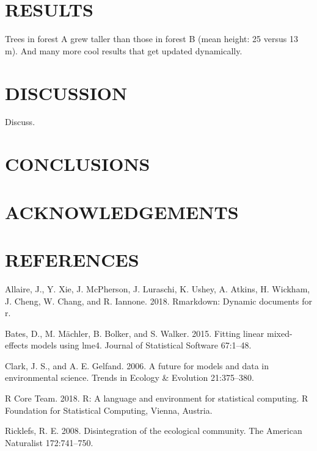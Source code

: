 \documentclass[11pt,a4paper]{article}
\begin{document}
\hypertarget{results}{%
\section{RESULTS}\label{results}}

Trees in forest A grew taller than those in forest B (mean height: 25
versus 13 m). And many more cool results that get updated dynamically.

\hypertarget{discussion}{%
\section{DISCUSSION}\label{discussion}}

Discuss.

\hypertarget{conclusions}{%
\section{CONCLUSIONS}\label{conclusions}}

\hypertarget{acknowledgements}{%
\section{ACKNOWLEDGEMENTS}\label{acknowledgements}}

\hypertarget{references}{%
\section{REFERENCES}\label{references}}

\hypertarget{refs}{}
\leavevmode\hypertarget{ref-Allaire_2018}{}%
Allaire, J., Y. Xie, J. McPherson, J. Luraschi, K. Ushey, A. Atkins, H.
Wickham, J. Cheng, W. Chang, and R. Iannone. 2018. Rmarkdown: Dynamic
documents for r.

\leavevmode\hypertarget{ref-Bates_2015}{}%
Bates, D., M. Mächler, B. Bolker, and S. Walker. 2015. Fitting linear
mixed-effects models using lme4. Journal of Statistical Software
67:1--48.

\leavevmode\hypertarget{ref-Clark_2006}{}%
Clark, J. S., and A. E. Gelfand. 2006. A future for models and data in
environmental science. Trends in Ecology \& Evolution 21:375--380.

\leavevmode\hypertarget{ref-R_Core_Team_2018}{}%
R Core Team. 2018. R: A language and environment for statistical
computing. R Foundation for Statistical Computing, Vienna, Austria.

\leavevmode\hypertarget{ref-Ricklefs_2008}{}%
Ricklefs, R. E. 2008. Disintegration of the ecological community. The
American Naturalist 172:741--750.
\end{document}
